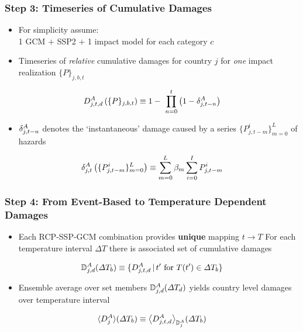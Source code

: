 \documentclass[
c,
11pt,
aspectratio=169, %
final,
]{beamer}
\begin{document}
\begin{frame}
  \frametitle{Step 3: Timeseries of Cumulative Damages}
      \begin{minipage}[r]{.6\linewidth}
        \begin{itemize}
  \item For simplicity assume:\\ 1 GCM $+$ SSP2 $+$ 1 impact model for each category $c$          
  \item Timeseries of \emph{relative} cumulative damages for country $j$ for \emph{one} impact realization $\lbrace P\rbrace_{j,b,t}$  
  \end{itemize}
  \begin{equation*}
     \DA_{j,t,d}\left(\lbrace P\rbrace_{j,b,t}\right)\equiv 1 - \ \prod_{n=0}^{t}\left(1-\dA_{j,t-n}\right)
   \end{equation*}
   \begin{itemize}
\item  $\delta^A_{j,t-n}$ denotes the `instantaneous' damage caused by a series $\lbrace P_{j,t-m}^i\rbrace_{m=0}^L$ of hazards   
   \end{itemize}
  \begin{equation*}
    \delta^A_{j,t}\left(\lbrace P_{j,t-m}^i\rbrace_{m=0}^L\right)\equiv \sum_{m=0}^L\beta_m\sum_{i=0}^IP_{j,t-m}^i
  \end{equation*}

\end{minipage}\hfill
\begin{minipage}[r]{.39\linewidth}
\end{minipage}
\end{frame}

\begin{frame}
  \frametitle{Step 4: From Event-Based to Temperature Dependent Damages}
  \begin{itemize}
  \item Each RCP-SSP-GCM combination provides \textbf{unique} mapping $t \rightarrow T$
    \arrowitem For each temperature interval $\Delta T$ there is associated set of cumulative damages
  \end{itemize}
    \begin{equation*}
   \mathbb{D}^A_{j,d}(\Delta T_b)\equiv\lbrace D^A_{j,t,d}\, \vert\, t' \text{ for } T(t')\in\Delta T_b \rbrace
\end{equation*}
\begin{itemize}
\item Ensemble average over set members $\mathbb{D}^A_{j,d}(\Delta T_d)$ yields country level damages over temperature interval  
\end{itemize}
\begin{equation*}
  \langle D^A_{j}\rangle(\Delta T_b)\equiv\big\langle D^A_{j,t,d}\big\rangle_{\mathbb{D}^A_{j}}(\Delta T_b)
\end{equation*}

\end{frame}
\end{document}
